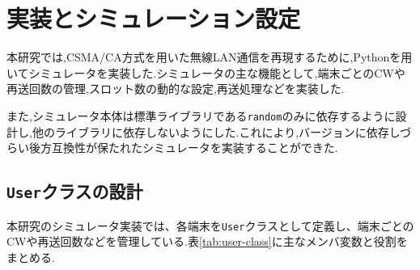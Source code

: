 \documentclass[a4paper, 10pt]{ltjsarticle}
\begin{document}

\section{実装とシミュレーション設定}

本研究では,CSMA/CA方式を用いた無線LAN通信を再現するために,Pythonを用いてシミュレータを実装した.シミュレータの主な機能として,端末ごとのCWや再送回数の管理,スロット数の動的な設定,再送処理などを実装した.

また,シミュレータ本体は標準ライブラリである\texttt{random}のみに依存するように設計し,他のライブラリに依存しないようにした.これにより,バージョンに依存しづらい後方互換性が保たれたシミュレータを実装することができた.


\subsection{\texttt{User}クラスの設計}
本研究のシミュレータ実装では、各端末を\texttt{User}クラスとして定義し、端末ごとのCWや再送回数などを管理している.表\ref{tab:user-class}に主なメンバ変数と役割をまとめる.

\end{document}
